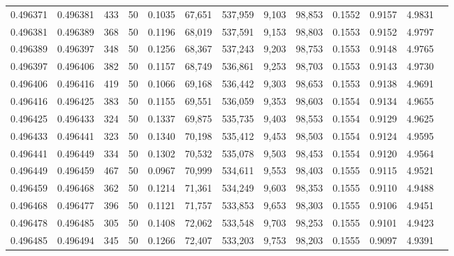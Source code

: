 \begin{tabular}{rrrrrrrrrrrrr}
0.496371 & 0.496381 & 433 &  50 &                                     0.1035 &  67,651 & 537,959 &   9,103 &  98,853 & 0.1552 & 0.9157 & 4.9831 \\
0.496381 & 0.496389 & 368 &  50 &                                     0.1196 &  68,019 & 537,591 &   9,153 &  98,803 & 0.1553 & 0.9152 & 4.9797 \\
0.496389 & 0.496397 & 348 &  50 &                                     0.1256 &  68,367 & 537,243 &   9,203 &  98,753 & 0.1553 & 0.9148 & 4.9765 \\
0.496397 & 0.496406 & 382 &  50 &                                     0.1157 &  68,749 & 536,861 &   9,253 &  98,703 & 0.1553 & 0.9143 & 4.9730 \\
0.496406 & 0.496416 & 419 &  50 &                                     0.1066 &  69,168 & 536,442 &   9,303 &  98,653 & 0.1553 & 0.9138 & 4.9691 \\
0.496416 & 0.496425 & 383 &  50 &                                     0.1155 &  69,551 & 536,059 &   9,353 &  98,603 & 0.1554 & 0.9134 & 4.9655 \\
0.496425 & 0.496433 & 324 &  50 &                                     0.1337 &  69,875 & 535,735 &   9,403 &  98,553 & 0.1554 & 0.9129 & 4.9625 \\
0.496433 & 0.496441 & 323 &  50 &                                     0.1340 &  70,198 & 535,412 &   9,453 &  98,503 & 0.1554 & 0.9124 & 4.9595 \\
0.496441 & 0.496449 & 334 &  50 &                                     0.1302 &  70,532 & 535,078 &   9,503 &  98,453 & 0.1554 & 0.9120 & 4.9564 \\
0.496449 & 0.496459 & 467 &  50 &                                     0.0967 &  70,999 & 534,611 &   9,553 &  98,403 & 0.1555 & 0.9115 & 4.9521 \\
0.496459 & 0.496468 & 362 &  50 &                                     0.1214 &  71,361 & 534,249 &   9,603 &  98,353 & 0.1555 & 0.9110 & 4.9488 \\
0.496468 & 0.496477 & 396 &  50 &                                     0.1121 &  71,757 & 533,853 &   9,653 &  98,303 & 0.1555 & 0.9106 & 4.9451 \\
0.496478 & 0.496485 & 305 &  50 &                                     0.1408 &  72,062 & 533,548 &   9,703 &  98,253 & 0.1555 & 0.9101 & 4.9423 \\
0.496485 & 0.496494 & 345 &  50 &                                     0.1266 &  72,407 & 533,203 &   9,753 &  98,203 & 0.1555 & 0.9097 & 4.9391 \\

\end{tabular}
